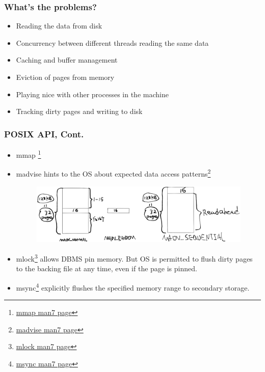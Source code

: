 \documentclass[
	11pt, %
]{beamer}
\begin{document}
\begin{frame}
	\frametitle{What's the problems?}
	\begin{itemize}
		\item Reading the data from disk
		\item Concurrency between different threads reading the same data
		\item Caching and buffer management
		\item Eviction of pages from memory
		\item Playing nice with other processes in the machine
		\item Tracking dirty pages and writing to disk
		
	\end{itemize}
\end{frame}
\begin{frame}
	\frametitle{POSIX API, Cont.}
	\begin{itemize}
		\item mmap \footnote[frame]{\href{https://man7.org/linux/man-pages/man2/mmap.2.html}{mmap man7 page}}
		\item madvise hints to the OS about expected data access patterns\footnote[frame]{\href{https://man7.org/linux/man-pages/man2/madvise.2.html}{madvise man7 page}}
		\begin{figure}[h]
			\includegraphics[width=0.99\linewidth]{images/readahead.png}
		\end{figure}
		\item mlock\footnote[frame]{\href{https://man7.org/linux/man-pages/man2/mlock.2.html}{mlock man7 page}} allows DBMS pin memory. {\color{red}But OS is permitted to flush dirty pages to the backing file at any time, even if the page is pinned.}
		\item msync\footnote[frame]{\href{https://man7.org/linux/man-pages/man2/msync.2.html}{msync man7 page}} explicitly flushes the specified memory range to secondary storage.
	\end{itemize}
\end{frame}
\end{document}
